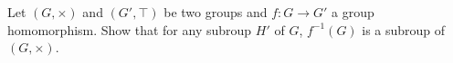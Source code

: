 Let $(G, \times)$ and $(G', \top)$ be two groups and $f : G \longrightarrow G'$ a group homomorphism.
Show that for any subroup $H'$ of $G$, $f^{-1}(G)$ is a subroup of $(G, \times)$.
